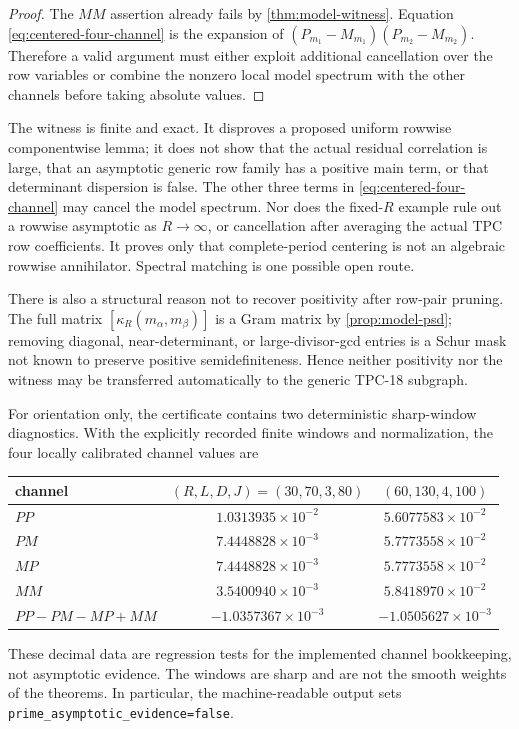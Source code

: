 \begin{proof}
The \(MM\) assertion already fails by
\cref{thm:model-witness}.  Equation \eqref{eq:centered-four-channel}
is the expansion of \((P_{m_1}-M_{m_1})(P_{m_2}-M_{m_2})\).
Therefore a valid argument must either exploit additional cancellation
over the row variables or combine the nonzero local model spectrum with
the other channels before taking absolute values.
\end{proof}

\begin{remark}
The witness is finite and exact.  It disproves a proposed uniform
rowwise componentwise lemma; it does not show that the actual residual
correlation is large, that an asymptotic generic row family has a
positive main term, or that determinant dispersion is false.  The
other three terms in \eqref{eq:centered-four-channel} may cancel the
model spectrum.  Nor does the fixed-\(R\) example rule out a rowwise
asymptotic as \(R\to\infty\), or cancellation after averaging the
actual TPC row coefficients.  It proves only that complete-period
centering is not an algebraic rowwise annihilator.  Spectral matching
is one possible open route.
\end{remark}

There is also a structural reason not to recover positivity after
row-pair pruning.  The full matrix
\([\kappa_R(m_\alpha,m_\beta)]\) is a Gram matrix by
\cref{prop:model-psd}; removing diagonal, near-determinant, or
large-divisor-gcd entries is a Schur mask not known to preserve
positive semidefiniteness.  Hence neither positivity nor the witness
may be transferred automatically to the generic TPC-18 subgraph.

For orientation only, the certificate contains two deterministic
sharp-window diagnostics.  With the explicitly recorded finite windows
and normalization, the four locally calibrated channel values are
\begin{center}
\begin{tabular}{@{}lcc@{}}
\toprule
channel & \((R,L,D,J)=(30,70,3,80)\)
& \((60,130,4,100)\) \\
\midrule
\(PP\) & \(1.0313935\times10^{-2}\) & \(5.6077583\times10^{-2}\) \\
\(PM\) & \(7.4448828\times10^{-3}\) & \(5.7773558\times10^{-2}\) \\
\(MP\) & \(7.4448828\times10^{-3}\) & \(5.7773558\times10^{-2}\) \\
\(MM\) & \(3.5400940\times10^{-3}\) & \(5.8418970\times10^{-2}\) \\
\(PP-PM-MP+MM\) & \(-1.0357367\times10^{-3}\)
& \(-1.0505627\times10^{-3}\) \\
\bottomrule
\end{tabular}
\end{center}
These decimal data are regression tests for the implemented channel
bookkeeping, not asymptotic evidence.  The windows are sharp and are
not the smooth weights of the theorems.  In particular, the
machine-readable output sets
\texttt{prime\_asymptotic\_evidence=false}.
